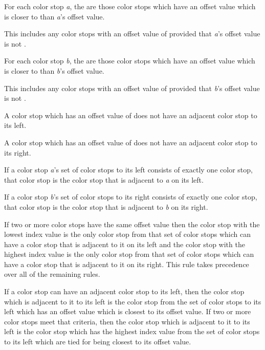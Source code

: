 \begin{enumeratea}
\item For each color stop \textit{a}, the  are those color stops which have an offset value which is closer to  than \textit{a}'s offset value.
\begin{note}
This includes any color stops with an offset value of  provided that \textit{a}'s offset value is not .
\end{note}

\item For each color stop \textit{b}, the  are those color stops which have an offset value which is closer to  than \textit{b}'s offset value.
\begin{note}
This includes any color stops with an offset value of  provided that \textit{b}'s offset value is not .
\end{note}

\item A color stop which has an offset value of  does not have an adjacent color stop to its left.

\item A color stop which has an offset value of  does not have an adjacent color stop to its right.

\item If a color stop \textit{a}'s set of color stops to its left consists of exactly one color stop, that color stop is the color stop that is adjacent to \textit{a} on its left.

\item If a color stop \textit{b}'s set of color stops to its right consists of exactly one color stop, that color stop is the color stop that is adjacent to \textit{b} on its right.

\item If two or more color stops have the same offset value then the color stop with the lowest index value is the only color stop from that set of color stops which can have a color stop that is adjacent to it on its left and the color stop with the highest index value is the only color stop from that set of color stops which can have a color stop that is adjacent to it on its right. This rule takes precedence over all of the remaining rules.

\item If a color stop can have an adjacent color stop to its left, then the color stop which is adjacent to it to its left is the color stop from the set of color stops to its left which has an offset value which is closest to its offset value. If two or more color stops meet that criteria, then the color stop which is adjacent to it to its left is the color stop which has the highest index value from the set of color stops to its left which are tied for being closest to its offset value.


\end{enumeratea}
